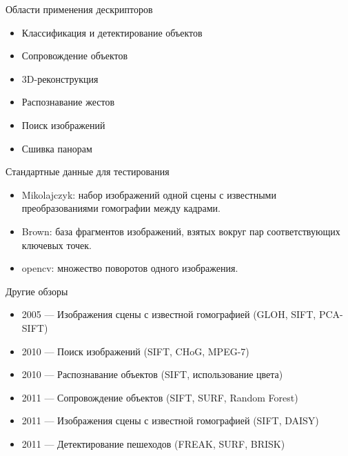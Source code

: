 \documentclass[14pt,mathserif,aspectratio=43]{beamer}
\begin{document}
\begin{frame}{Области применения дескрипторов}
    \begin{itemize}
        \item Классификация и детектирование объектов

        \item Сопровождение объектов

        \item 3D-реконструкция

        \item Распознавание жестов
		
        \item Поиск изображений

		\item Сшивка панорам
    \end{itemize}
\end{frame}

\begin{frame}{Стандартные данные для тестирования}
	\begin{itemize}
        \item Mikolajczyk: набор изображений одной сцены с известными преобразованиями гомографии между кадрами.
        \pause
        \item Brown: база фрагментов изображений, взятых вокруг пар соответствующих ключевых точек.
        \pause
        \item opencv: множество поворотов одного изображения.
    \end{itemize}
\end{frame}

\begin{frame}{Другие обзоры}
    \begin{itemize}

    	\item 2005 --- Изображения сцены с известной гомографией (GLOH, SIFT, PCA-SIFT)
    	\pause
    	\item 2010 --- Поиск изображений (SIFT, CHoG, MPEG-7)
    	\pause
		\item 2010 --- Распознавание объектов	(SIFT, использование цвета)
		\pause
		\item 2011 --- Сопровождение объектов (SIFT, SURF, Random Forest)
		\pause
		\item 2011 --- Изображения сцены с известной гомографией (SIFT, DAISY)
		\pause
		\item 2011 --- Детектирование пешеходов (FREAK, SURF, BRISK)
	\end{itemize}    
\end{frame}
\end{document}
